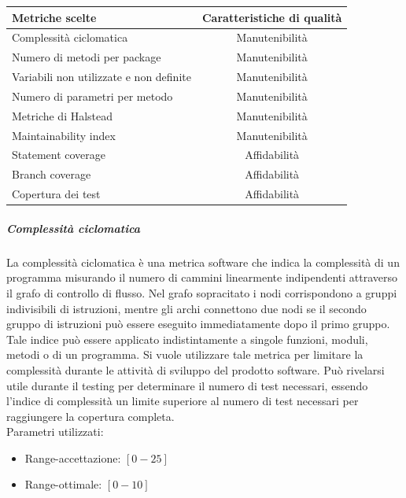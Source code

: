 \begin{center}

  \begin{tabular}{|l|c|}
    \hline
    \textbf{Metriche scelte} & \textbf{Caratteristiche di qualità} \\
    \hline
    Complessità ciclomatica  & Manutenibilità \\
    Numero di metodi per package & Manutenibilità \\
    Variabili non utilizzate e non definite & Manutenibilità \\
    Numero di parametri per metodo & Manutenibilità \\
    Metriche di Halstead  & Manutenibilità \\
    Maintainability index  & Manutenibilità \\
    Statement coverage & Affidabilità \\
    Branch coverage & Affidabilità \\
    Copertura dei test & Affidabilità \\
    \hline
  \end{tabular}
\end{center}


\subparagraph{Complessità ciclomatica}
La complessità ciclomatica è una metrica software che indica la complessità di un programma
misurando il numero di cammini linearmente indipendenti attraverso il grafo di controllo di flusso.
Nel grafo sopracitato i nodi corrispondono a gruppi indivisibili di istruzioni, mentre gli archi
connettono due nodi se il secondo gruppo di istruzioni può essere eseguito immediatamente dopo
il primo gruppo. Tale indice può essere applicato indistintamente a singole funzioni, moduli,
metodi o  di un programma. Si vuole utilizzare tale metrica per limitare la complessità
durante le attività di sviluppo del prodotto software. Può rivelarsi utile durante il testing per
determinare il numero  di test necessari, essendo l’indice di complessità un limite superiore
al numero di test necessari per raggiungere la copertura completa. \\

Parametri utilizzati:
\begin{itemize}
\item Range-accettazione: $[0 - 25]$
\item Range-ottimale: $[0 - 10]$
\end{itemize}

